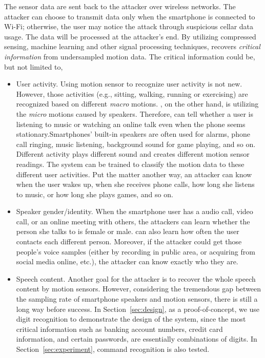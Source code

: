 The sensor data are sent back to the attacker over wireless networks. The attacker can choose to transmit data only when the smartphone is connected to Wi-Fi; otherwise, the user may notice the attack through suspicious cellar data usage. The data will be processed at the attacker's end. By utilizing compressed sensing, machine learning and other signal processing techniques, {\systemName} recovers \textit{critical information} from undersampled motion data.
%
The critical information could be, but not limited to,
\begin{itemize}
	\item
	User activity. Using motion sensor to recognize user activity is not new. However, those activities (e.g., sitting, walking, running or exercising)  are recognized based on different \textit{macro} motions. {\systemName}, on the other hand, is utilizing the \textit{micro} motions caused by speakers. Therefore, {\systemName} can tell whether a user is listening to music or watching an online talk even when the phone seems stationary.Smartphones' built-in speakers are often used for alarms, phone call ringing, music listening, background sound for game playing, and so on. Different activity plays different sound and creates different motion sensor readings. The {\systemName} system can be trained to classify the motion data to these different user activities. Put the matter another way, an attacker can know when the user wakes up, when she receives phone calls, how long she listens to music, or how long she plays games, and so on.
	\item 
	Speaker gender/identity. When the smartphone user has a audio call, video call, or an online meeting with others, the {\attackName} attackers can learn whether the person she talks to is female or male. {\systemName} can also learn how often the user contacts each different person. Moreover, if the attacker could get those people's voice samples (either by recording in public area, or acquiring from social media online, etc.), the attacker can know exactly who they are.
	\item
	Speech content. Another goal for the attacker is to recover the whole speech content by motion sensors. However, considering the tremendous gap between the sampling rate of smartphone speakers and motion sensors, there is still a long way before success. In Section~\ref{sec:design}, as a proof-of-concept, we use digit recognition to demonstrate the design of the {\systemName} system, since the most critical information such as  banking account numbers, credit card information, and certain passwords,  are essentially combinations of digits. In Section~\ref{sec:experiment}, command recognition is also tested.
\end{itemize}

